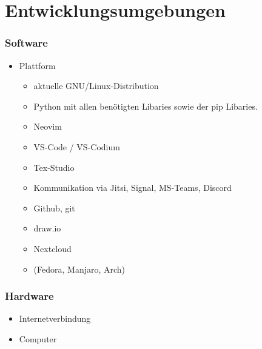 \chapter{Entwicklungsumgebungen}

\subsection{Software}

\begin{itemize}
	\item Plattform
		\begin{itemize}
			\item aktuelle GNU/Linux-Distribution
			\item Python mit allen benötigten Libaries sowie der pip Libaries.
		\end{itemize}

		\begin{itemize}
			\item Neovim
			\item VS-Code / VS-Codium
			\item Tex-Studio
			\item Kommunikation via Jitsi, Signal, MS-Teams, Discord
			\item Github, git
			\item draw.io
			\item Nextcloud
			\item \Linux (Fedora, Manjaro, Arch)
		\end{itemize}
\end{itemize}

\subsection{Hardware}

\begin{itemize}
	\item Internetverbindung
	\item Computer
\end{itemize}
